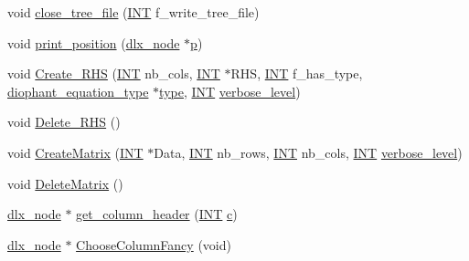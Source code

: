 \begin{DoxyCompactItemize}
\item 
void \mbox{\hyperlink{_l_i_b_2_g_a_l_o_i_s_2dlx_8_c_ac99ce7417f74261f360db866919e0cd0}{close\+\_\+tree\+\_\+file}} (\mbox{\hyperlink{galois_8h_a09fddde158a3a20bd2dcadb609de11dc}{I\+NT}} f\+\_\+write\+\_\+tree\+\_\+file)
\item 
void \mbox{\hyperlink{_l_i_b_2_g_a_l_o_i_s_2dlx_8_c_a8b8b7fc407e960da5142b9c448de514b}{print\+\_\+position}} (\mbox{\hyperlink{structdlx__node}{dlx\+\_\+node}} $\ast$\mbox{\hyperlink{alphabet2_8_c_a533391314665d6bf1b5575e9a9cd8552}{p}})
\item 
void \mbox{\hyperlink{_l_i_b_2_g_a_l_o_i_s_2dlx_8_c_a9b3fdfe40101ef3aeeff26c7e4c3b7b1}{Create\+\_\+\+R\+HS}} (\mbox{\hyperlink{galois_8h_a09fddde158a3a20bd2dcadb609de11dc}{I\+NT}} nb\+\_\+cols, \mbox{\hyperlink{galois_8h_a09fddde158a3a20bd2dcadb609de11dc}{I\+NT}} $\ast$R\+HS, \mbox{\hyperlink{galois_8h_a09fddde158a3a20bd2dcadb609de11dc}{I\+NT}} f\+\_\+has\+\_\+type, \mbox{\hyperlink{galois_8h_a331aa0f3283349b42f6bab83e017cdc1}{diophant\+\_\+equation\+\_\+type}} $\ast$\mbox{\hyperlink{_l_i_b_2_g_a_l_o_i_s_2dlx_8_c_ad241c8005abf9f323e9fffec67f55abf}{type}}, \mbox{\hyperlink{galois_8h_a09fddde158a3a20bd2dcadb609de11dc}{I\+NT}} \mbox{\hyperlink{simeon_8_c_a818073fbcc2f439e7c56952f67386122}{verbose\+\_\+level}})
\item 
void \mbox{\hyperlink{_l_i_b_2_g_a_l_o_i_s_2dlx_8_c_a7c7d3c42f4e1dea4e117e58da6b557d4}{Delete\+\_\+\+R\+HS}} ()
\item 
void \mbox{\hyperlink{_l_i_b_2_g_a_l_o_i_s_2dlx_8_c_a89ddc9af8630a87164d84a96b956e67a}{Create\+Matrix}} (\mbox{\hyperlink{galois_8h_a09fddde158a3a20bd2dcadb609de11dc}{I\+NT}} $\ast$Data, \mbox{\hyperlink{galois_8h_a09fddde158a3a20bd2dcadb609de11dc}{I\+NT}} nb\+\_\+rows, \mbox{\hyperlink{galois_8h_a09fddde158a3a20bd2dcadb609de11dc}{I\+NT}} nb\+\_\+cols, \mbox{\hyperlink{galois_8h_a09fddde158a3a20bd2dcadb609de11dc}{I\+NT}} \mbox{\hyperlink{simeon_8_c_a818073fbcc2f439e7c56952f67386122}{verbose\+\_\+level}})
\item 
void \mbox{\hyperlink{_l_i_b_2_g_a_l_o_i_s_2dlx_8_c_a0d0d8367563593a49ea746e787a1a38a}{Delete\+Matrix}} ()
\item 
\mbox{\hyperlink{structdlx__node}{dlx\+\_\+node}} $\ast$ \mbox{\hyperlink{_l_i_b_2_g_a_l_o_i_s_2dlx_8_c_afb1d61622a44d0089bc62efbb3ad9bd9}{get\+\_\+column\+\_\+header}} (\mbox{\hyperlink{galois_8h_a09fddde158a3a20bd2dcadb609de11dc}{I\+NT}} \mbox{\hyperlink{alphabet2_8_c_a4e1e0e72dd773439e333c84dd762a9c3}{c}})
\item 
\mbox{\hyperlink{structdlx__node}{dlx\+\_\+node}} $\ast$ \mbox{\hyperlink{_l_i_b_2_g_a_l_o_i_s_2dlx_8_c_a9e4dbecc7e3b59f9ff63364f043a936b}{Choose\+Column\+Fancy}} (void)

\end{DoxyCompactItemize}
